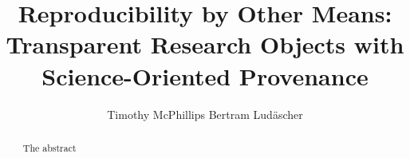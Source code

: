 \documentclass[sigconf,screen,nonacm]{acmart}
\begin{document}
\title[Reproducibility by Other Means]{Reproducibility by Other Means: Transparent Research Objects with Science-Oriented Provenance}

\author{Timothy McPhillips  \qquad Bertram Lud\"ascher}
 

\maketitle
\begin{abstract}
The abstract
\end{abstract}


















%
%


\end{document}
